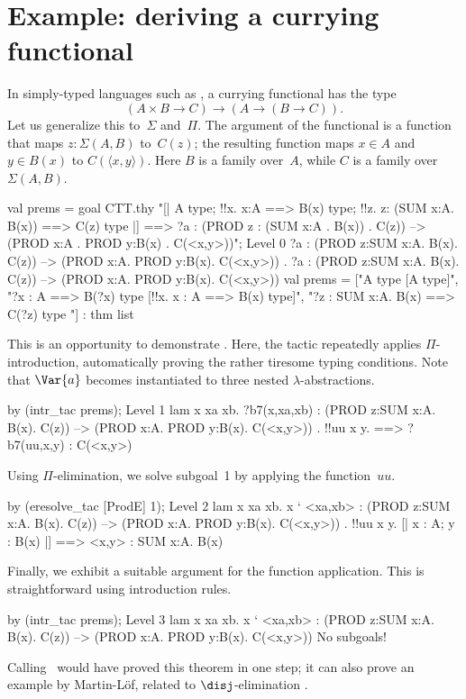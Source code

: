 \section{Example: deriving a currying functional}
In simply-typed languages such as {\ML}, a currying functional has the type 
\[ (A\times B \to C) \to (A\to (B\to C)). \]
Let us generalize this to~$\Sigma$ and~$\Pi$.  The argument of the
functional is a function that maps $z:\Sigma(A,B)$ to~$C(z)$; the resulting
function maps $x\in A$ and $y\in B(x)$ to $C(\langle x,y\rangle)$.  Here
$B$ is a family over~$A$, while $C$ is a family over $\Sigma(A,B)$.
\begin{ttbox}
val prems = goal CTT.thy
    "[| A type; !!x. x:A ==> B(x) type;                    \ttback
\ttback               !!z. z: (SUM x:A. B(x)) ==> C(z) type |]   \ttback
\ttback    ==> ?a : (PROD z : (SUM x:A . B(x)) . C(z))           \ttback
\ttback         --> (PROD x:A . PROD y:B(x) . C(<x,y>))";
{\out Level 0}
{\out ?a : (PROD z:SUM x:A. B(x). C(z)) --> (PROD x:A. PROD y:B(x). C(<x,y>))}
{. ?a : (PROD z:SUM x:A. B(x). C(z)) -->}
{\out          (PROD x:A. PROD y:B(x). C(<x,y>))}
\ttbreak
{\out val prems = ["A type  [A type]",}
{\out              "?x : A ==> B(?x) type  [!!x. x : A ==> B(x) type]",}
{\out              "?z : SUM x:A. B(x) ==> C(?z) type}
{\out               [!!z. z : SUM x:A. B(x) ==> C(z) type]"] : thm list}
\end{ttbox}
This is an opportunity to demonstrate .  Here, the tactic
repeatedly applies $\Pi$-introduction, automatically proving the rather
tiresome typing conditions.  Note that $\Var{a}$ becomes instantiated to
three nested $\lambda$-abstractions.
\begin{ttbox}
by (intr_tac prems);
{\out Level 1}
{\out lam x xa xb. ?b7(x,xa,xb)}
{\out : (PROD z:SUM x:A. B(x). C(z)) --> (PROD x:A. PROD y:B(x). C(<x,y>))}
{. !!uu x y.}
{ ==>}
{\out        ?b7(uu,x,y) : C(<x,y>)}
\end{ttbox}
Using $\Pi$-elimination, we solve subgoal~1 by applying the function~$uu$.
\begin{ttbox}
by (eresolve_tac [ProdE] 1);
{\out Level 2}
{\out lam x xa xb. x ` <xa,xb>}
{\out : (PROD z:SUM x:A. B(x). C(z)) --> (PROD x:A. PROD y:B(x). C(<x,y>))}
{. !!uu x y. [| x : A; y : B(x) |] ==> <x,y> : SUM x:A. B(x)}
\end{ttbox}
Finally, we exhibit a suitable argument for the function application.  This
is straightforward using introduction rules.
\begin{ttbox}
by (intr_tac prems);
{\out Level 3}
{\out lam x xa xb. x ` <xa,xb>}
{\out : (PROD z:SUM x:A. B(x). C(z)) --> (PROD x:A. PROD y:B(x). C(<x,y>))}
{\out No subgoals!}
\end{ttbox}
Calling~ would have proved this theorem in one step; it can
also prove an example by Martin-L\"of, related to $\disj$-elimination
\cite[page~58]{martinlof84}.


